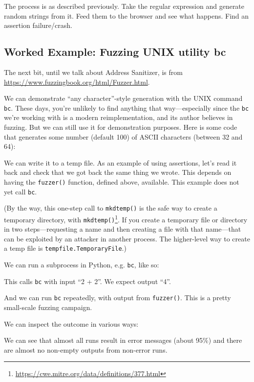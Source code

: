 \documentclass[11pt]{article}
\begin{document}
The process is as described previously. Take the regular expression
and generate random strings from it.  Feed them to the browser and see
what happens. Find an assertion failure/crash.

\subsection*{Worked Example: Fuzzing UNIX utility bc}
The next bit, until we talk about Address Sanitizer, is from \url{https://www.fuzzingbook.org/html/Fuzzer.html}.

We can demonstrate ``any character''-style generation with the UNIX command {\tt bc}. These days,
you're unlikely to find anything that way---especially since the \texttt{bc} we're working with is a modern reimplementation, and its author believes in fuzzing. But we can still use it for demonstration purposes. Here is some code that generates some number (default 100) of ASCII characters (between 32 and 64):



We can write it to a temp file. As an example of using assertions, let's read it back and check that we got back the same thing we wrote. This depends on having the \texttt{fuzzer()} function, defined above, available. This example does not yet call \texttt{bc}.


(By the way, this one-step call to \texttt{mkdtemp()} is the safe way to create a temporary directory, with \texttt{mkdtemp()}\footnote{\url{https://cwe.mitre.org/data/definitions/377.html}}. If you create a temporary file or directory in two steps---requesting a name and then creating a file with that name---that can be exploited by an attacker in another process. The higher-level way to create a temp file is \texttt{tempfile.TemporaryFile}.)

We can run a subprocess in Python, e.g. \texttt{bc}, like so:

This calls \texttt{bc} with input ``2 + 2''. We expect output ``4''.

And we can run \texttt{bc} repeatedly, with output from \texttt{fuzzer()}. This is a pretty small-scale fuzzing campaign.


We can inspect the outcome in various ways:

We can see that almost all runs result in error messages (about 95\%) and there are almost no non-empty outputs from non-error runs.
\end{document}
